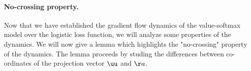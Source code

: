 \documentclass{article}
\theoremstyle{plain}
\newtheorem{lemma}[theorem]{Lemma}
\theoremstyle{definition}
\newtheorem{assumption}[theorem]{Assumption}
\theoremstyle{remark}
\begin{document}
\paragraph{No-crossing property.} Now that we have established the gradient flow dynamics of the value-softmax model over the logistic loss function, we will analyze some properties of the dynamics. We will now give a lemma which highlights the "no-crossing" property of the dynamics. The lemma proceeds by studing the differences between co-ordinates of the projection vector $\uu$ and $\aa$.




\end{document}
